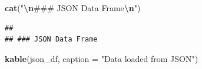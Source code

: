 \documentclass[
]{article}
\newenvironment{Shaded}{\begin{snugshade}}{\end{snugshade}}
\newcommand{\AttributeTok}[1]{\textcolor[rgb]{0.13,0.29,0.53}{#1}}
\newcommand{\FunctionTok}[1]{\textcolor[rgb]{0.13,0.29,0.53}{\textbf{#1}}}
\newcommand{\NormalTok}[1]{#1}
\newcommand{\SpecialCharTok}[1]{\textcolor[rgb]{0.81,0.36,0.00}{\textbf{#1}}}
\newcommand{\StringTok}[1]{\textcolor[rgb]{0.31,0.60,0.02}{#1}}
\begin{document}
\begin{Shaded}
\begin{Highlighting}[]
\FunctionTok{cat}\NormalTok{(}\StringTok{"}\SpecialCharTok{\textbackslash{}n}\StringTok{\#\#\# JSON Data Frame}\SpecialCharTok{\textbackslash{}n}\StringTok{"}\NormalTok{)}
\end{Highlighting}
\end{Shaded}

\begin{verbatim}
## 
## ### JSON Data Frame
\end{verbatim}

\begin{Shaded}
\begin{Highlighting}[]
\FunctionTok{kable}\NormalTok{(json\_df, }\AttributeTok{caption =} \StringTok{"Data loaded from JSON"}\NormalTok{)}
\end{Highlighting}
\end{Shaded}
\end{document}
